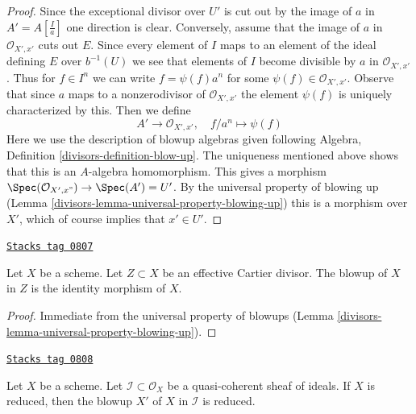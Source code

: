 \begin{proof}

Since the exceptional divisor over $U'$ is cut out by the image of
$a$ in $A' = A[\frac{I}{a}]$ one direction is clear. Conversely, assume
that the image of $a$ in $\mathcal{O}_{X', x'}$ cuts out $E$.
Since every element of $I$ maps to an element of the ideal
defining $E$ over $b^{-1}(U)$ we see that elements of $I$ become
divisible by $a$ in $\mathcal{O}_{X', x'}$. Thus for $f \in I^n$
we can write $f = \psi(f) a^n$ for some $\psi(f) \in \mathcal{O}_{X', x'}$.
Observe that since $a$ maps to a nonzerodivisor of $\mathcal{O}_{X', x'}$
the element $\psi(f)$ is uniquely characterized by this. Then we
define
$$
A' \longrightarrow \mathcal{O}_{X', x'},\quad
f/a^n \longmapsto \psi(f)
$$
Here we use the description of blowup algebras given following
Algebra, Definition \ref{divisors-definition-blow-up}. The uniqueness mentioned
above shows that this is an $A$-algebra homomorphism.
This gives a morphism $\Spec(\mathcal{O}_{X', x"}) \to \Spec(A') = U'$.
By the universal property of blowing up
(Lemma \ref{divisors-lemma-universal-property-blowing-up})
this is a morphism over
$X'$, which of course implies that $x' \in U'$.
\end{proof}

\begin{lemma}
\label{divisors-lemma-blow-up-effective-Cartier-divisor}
\href{https://stacks.math.columbia.edu/tag/0807}{\texttt{Stacks tag 0807}}

Let $X$ be a scheme. Let $Z \subset X$ be an effective Cartier divisor.
The blowup of $X$ in $Z$ is the identity morphism of $X$.
\end{lemma}

\begin{proof}

Immediate from the universal property of blowups
(Lemma \ref{divisors-lemma-universal-property-blowing-up}).
\end{proof}

\begin{lemma}
\label{divisors-lemma-blow-up-reduced-scheme}
\href{https://stacks.math.columbia.edu/tag/0808}{\texttt{Stacks tag 0808}}

Let $X$ be a scheme. Let $\mathcal{I} \subset \mathcal{O}_X$ be a
quasi-coherent sheaf of ideals. If $X$ is reduced, then the
blowup $X'$ of $X$ in $\mathcal{I}$ is reduced.
\end{lemma}

